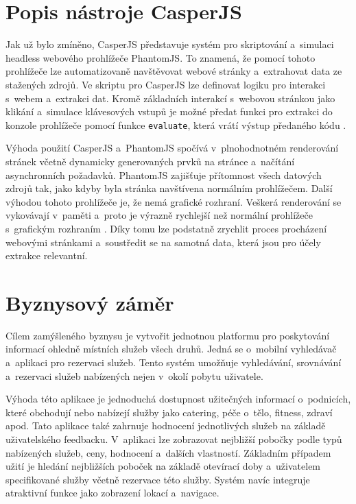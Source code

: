 \documentclass[11pt,a4paper]{article}
\begin{document}
\section{Popis nástroje CasperJS}
Jak už bylo zmíněno, CasperJS představuje systém pro skriptování a~simulaci headless webového prohlížeče PhantomJS. To znamená, že pomocí tohoto prohlížeče lze automatizovaně navštěvovat webové stránky a~extrahovat data ze stažených zdrojů. Ve skriptu pro CasperJS lze definovat logiku pro interakci s~webem a~extrakci dat. Kromě základních interakcí s~webovou stránkou jako klikání a~simulace klávesových vstupů je možné předat funkci pro extrakci do konzole prohlížeče pomocí funkce \texttt{evaluate}, která vrátí výstup předaného kódu \cite{hayton}.

Výhoda použití CasperJS a~PhantomJS spočívá v~plnohodnotném renderování stránek včetně dynamicky generovaných prvků na stránce a~načítání asynchronních požadavků. PhantomJS zajišťuje přítomnost všech datových zdrojů tak, jako kdyby byla stránka navštívena normálním prohlížečem. Další výhodou tohoto prohlížeče je, že nemá grafické rozhraní. Veškerá renderování se vykovávají v~paměti a~proto je výrazně rychlejší než normální prohlížeče s~grafickým rozhraním \cite{greco}. Díky tomu lze podstatně zrychlit proces procházení webovými stránkami a~soustředit se na samotná data, která jsou pro účely extrakce relevantní.


\section{Byznysový záměr}
Cílem zamýšleného byznysu je vytvořit jednotnou platformu pro poskytování informací ohledně místních služeb všech druhů. Jedná se o~mobilní vyhledávač a~aplikaci pro rezervaci služeb. Tento systém umožňuje vyhledávání, srovnávání a~rezervaci služeb nabízených  nejen v~okolí pobytu uživatele. 

Výhoda této aplikace je jednoduchá dostupnost užitečných informací o~podnicích, které obchodují nebo nabízejí služby jako catering, péče o~tělo, fitness, zdraví apod. Tato aplikace také zahrnuje hodnocení jednotlivých služeb na základě uživatelského feedbacku. V~aplikaci lze zobrazovat nejbližší pobočky podle typů nabízených služeb, ceny, hodnocení a~dalších vlastností. Základním případem užití je hledání nejbližších poboček na základě otevírací doby a~uživatelem specifikované služby včetně rezervace této služby. Systém navíc integruje atraktivní funkce jako zobrazení lokací a~navigace.
\end{document}

